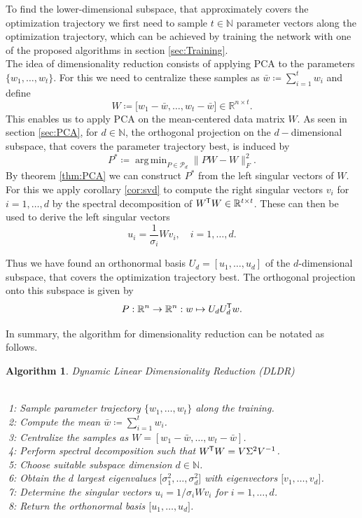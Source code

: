 \documentclass[11pt, a4paper]{article}
\newtheorem{algorithm}[theorem]{Algorithm}
\newcommand{\N}{\mathbb{N}}
\newcommand{\R}{\mathbb{R}}
\renewcommand{\P}{\mathcal{P}}
\newcommand*{\tr}{^{\mkern-1.5mu\mathsf{T}}}
\DeclareMathOperator*{\argmin}{arg\,min}
\begin{document}
To find the lower-dimensional subspace, that approximately covers the optimization trajectory we first need to sample $t \in \N$ parameter vectors along the optimization trajectory, which can be achieved by training the network with one of the proposed algorithms in section \ref{sec:Training}. \\

The idea of dimensionality reduction consists of applying PCA to the parameters $\{ w_1, \dots, w_t \}$. For this we need to centralize these samples as $\bar{w} \coloneq\sum_{i=1}^{t} w_i$ and define
\[ W \coloneq \big [ w_1 - \bar{w}, \dots, w_t - \bar{w} \big ] \in \R^{n \times t}. \]
This enables us to apply PCA on the mean-centered data matrix $W$. As seen in section \ref{sec:PCA}, for $d \in \N$, the orthogonal projection on the $d-$dimensional subspace, that covers the parameter trajectory best, is induced by
\[ P^* \coloneq \argmin_{P \in \P_d} \big \| PW - W \big \|_F^2. \]
By theorem \ref{thm:PCA} we can construct $P^*$ from the left singular vectors of $W$. For this we apply corollary \ref{cor:svd} to compute the right singular vectors $v_i$ for $i=1,\dots,d$ by the spectral decomposition of $W\tr W \in \R^{t \times t}$. These can then be used to derive the left singular vectors
\[ u_i = \frac{1}{\sigma_i} Wv_i, \quad i=1, \dots, d. \]

Thus we have found an orthonormal basis $U_d = [u_1, \dots, u_d]$ of the $d$-dimensional subspace, that covers the optimization trajectory best. The orthogonal projection onto this subspace is given by
\[ P : \R^n \to \R^n : w \mapsto U_dU_d\tr w. \]

In summary, the algorithm for dimensionality reduction can be notated as follows.

\begin{algorithm}
\caption{Dynamic Linear Dimensionality Reduction (DLDR)} \ \\
\textcolor{white}{$\Big |$}1: Sample parameter trajectory $\{ w_1, \dots, w_t\}$ along the training. \\
\textcolor{white}{$\Big |$}2: Compute the mean $\bar{w} \coloneq\sum_{i=1}^{t} w_i$. \\
\textcolor{white}{$\Big |$}3: Centralize the samples as $W = [w_1-\bar{w}, \dots, w_t - \bar{w}]$. \\
\textcolor{white}{$\Big |$}4: Perform spectral decomposition such that $W\tr W = V \Sigma^2 V^{-1}$.  \\
\textcolor{white}{$\Big |$}5: Choose suitable subspace dimension $d \in \N$. \\
\textcolor{white}{$\Big |$}6: Obtain the $d$ largest eigenvalues $ \big [\sigma_1^2, \dots, \sigma_d^2 \big ]$ with eigenvectors $ \big [v_1, \dots, v_d \big ]$. \\
\textcolor{white}{$\Big |$}7: Determine the singular vectors $u_i = 1/\sigma_iWv_i$ for $i=1, \dots, d$. \\
\textcolor{white}{$\Big |$}8: Return the orthonormal basis $ \big [u_1, \dots, u_d \big ]$.
\end{algorithm}
\end{document}
